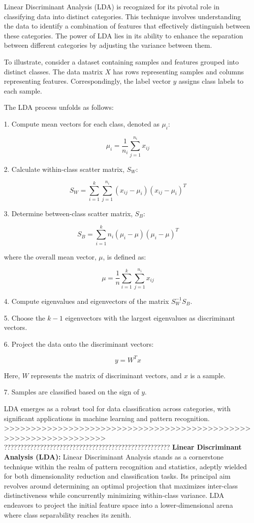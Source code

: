 \documentclass[8pt,a4paper,oneside]{elsarticle}
\begin{document}
Linear Discriminant Analysis (LDA) is recognized for its pivotal role in classifying data into distinct categories. This technique involves understanding the data to identify a combination of features that effectively distinguish between these categories. The power of LDA lies in its ability to enhance the separation between different categories by adjusting the variance between them.

To illustrate, consider a dataset containing samples and features grouped into distinct classes. The data matrix \(X\) has rows representing samples and columns representing features. Correspondingly, the label vector \(y\) assigns class labels to each sample.

The LDA process unfolds as follows:

1. Compute mean vectors for each class, denoted as \(\mu_i\):

\[
\mu_i = \frac{1}{n_i}\sum_{j=1}^{n_i} x_{ij}
\]

2. Calculate within-class scatter matrix, \(S_W\):

\[
S_W = \sum_{i=1}^k \sum_{j=1}^{n_i} (x_{ij} - \mu_i)(x_{ij} - \mu_i)^T
\]

3. Determine between-class scatter matrix, \(S_B\):

\[
S_B = \sum_{i=1}^k n_i(\mu_i - \mu)(\mu_i - \mu)^T
\]

where the overall mean vector, \(\mu\), is defined as:

\[
\mu = \frac{1}{n}\sum_{i=1}^k \sum_{j=1}^{n_i} x_{ij}
\]

4. Compute eigenvalues and eigenvectors of the matrix \(S_W^{-1}S_B\).

5. Choose the \(k-1\) eigenvectors with the largest eigenvalues as discriminant vectors.

6. Project the data onto the discriminant vectors:

\[
y = W^Tx
\]

Here, \(W\) represents the matrix of discriminant vectors, and \(x\) is a sample.

7. Samples are classified based on the sign of \(y\).

LDA emerges as a robust tool for data classification across categories, with significant applications in machine learning and pattern recognition.
>>>>>>>>>>>>>>>>>>>>>>>>>>>>>>>>>>>>>>>>>>>>>>>>>>>>>>>>>>>>>>>>>
???????????????????????????????????????????????????
\textbf{Linear Discriminant Analysis (LDA):}
Linear Discriminant Analysis stands as a cornerstone technique within the realm of pattern recognition and statistics, adeptly wielded for both dimensionality reduction and classification tasks. Its principal aim revolves around determining an optimal projection that maximizes inter-class distinctiveness while concurrently minimizing within-class variance\cite{duda2000pattern_disc_duda_38}\cite{10.1016/c2009-0-27872-x_discrim_36}. LDA endeavors to project the initial feature space into a lower-dimensional arena where class separability reaches its zenith.
\end{document}
